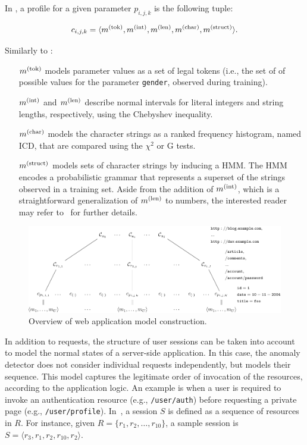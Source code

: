 \begin{example}\label{ex:web-models}
  In \webanomaly, a profile for a given parameter $p_{i,j,k}$ is the
  following tuple:

  \begin{displaymath}
    c_{i,j,k}=\langle m^{\left(\text{tok}\right)}, m^{\left(\text{int}\right)}, m^{\left(\text{len}\right)}, m^{\left(\text{char}\right)}, m^{\left(\text{struct}\right)} \rangle.
  \end{displaymath}

  \noindent Similarly to \LibAnomaly:

  \begin{itemize}
  \item [$m^{\left(\text{tok}\right)}$] models parameter values as a set of legal tokens
    (i.e., the set of of possible values for the parameter
    \texttt{gender}, observed during training).
  \item [$m^{\left(\text{int}\right)}$] and $m^{\left(\text{len}\right)}$ describe normal intervals for literal
    integers and string lengths, respectively, using the Chebyshev
    inequality.
  \item [$m^{\left(\text{char}\right)}$] models the character strings as a ranked frequency
    histogram, named \ac{ICD}, that are compared using the $\chi^2$ or
    G tests.
  \item [$m^{\left(\text{struct}\right)}$] models sets of character strings by inducing a
    \ac{HMM}. The \ac{HMM} encodes a probabilistic grammar
    that represents a superset of the strings observed in a training
    set. Aside from the addition of $m^{\left(\text{int}\right)}$, which is a
    straightforward generalization of $m^{\left(\text{len}\right)}$ to numbers, the
    interested reader may refer to~\citep{kruegel:jcn2005:webanomaly}
    for further details.
  \end{itemize}
\end{example}

\begin{figure}[p]
  \centering
  \includegraphics[angle=-90,width=.6\textwidth]{figures/web/profiles}
  \caption{Overview of web application model construction.}
  \label{fig:profiles}
\end{figure}

In addition to requests, the structure of user sessions can be taken
into account to model the normal states of a server-side
application. In this case, the anomaly detector does not consider
individual requests independently, but models their sequence. This
model captures the legitimate order of invocation of the resources,
according to the application logic. An example is when a user is
required to invoke an authentication resource (e.g.,
\texttt{/user/auth}) before requesting a private page (e.g.,
\texttt{/user/profile}). In~\citep{kruegel:jcn2005:webanomaly}, a
session $S$ is defined as a sequence of resources in $R$. For
instance, given $R = \{r_{1}, r_{2}, \dots, r_{10}\}$, a sample
session is $S = \langle r_{3}, r_{1}, r_{2}, r_{10}, r_{2}\rangle$.

